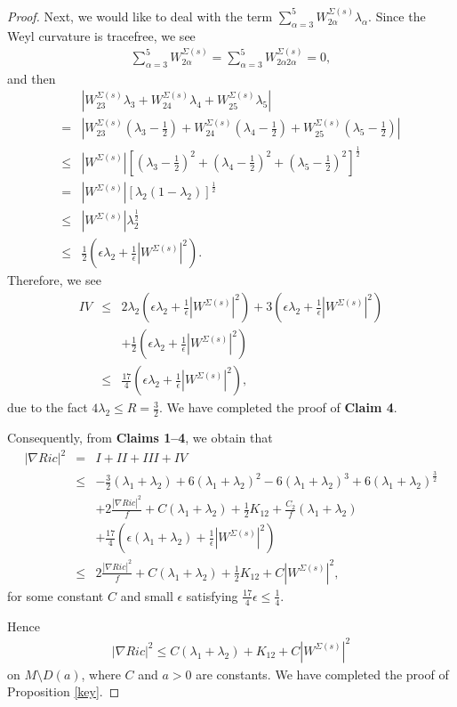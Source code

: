 \documentclass[12pt]{amsart}
\newcommand{\ban}{\begin{eqnarray*}}
\newcommand{\ean}{\end{eqnarray*}}
\begin{document}
\begin{proof}
		
		Next, we would like to deal with the term $\sum_{\alpha=3}^5 W^{\Sigma(s)}_{2\alpha}\lambda_{\alpha}$. Since the Weyl curvature is tracefree,  we see
		\ban
		\sum_{\alpha=3}^5W^{\Sigma(s)}_{2\alpha}=\sum_{\alpha=3}^5W^{\Sigma(s)}_{2\alpha2\alpha}=0,
		\ean
		and then
		\begin{equation}\label{w2a}
		\begin{aligned}
		&|W^{\Sigma(s)}_{23}\lambda_{3}+W^{\Sigma(s)}_{24}\lambda_{4}+W^{\Sigma(s)}_{25}\lambda_{5}|\\
		=&|W^{\Sigma(s)}_{23}(\lambda_{3}-\frac{1}{2})+W^{\Sigma(s)}_{24}(\lambda_{4}-\frac{1}{2})+W^{\Sigma(s)}_{25}(\lambda_{5}-\frac{1}{2})|\\
		\leq&|W^{\Sigma(s)}|[(\lambda_{3}-\frac{1}{2})^2+(\lambda_{4}-\frac{1}{2})^2+(\lambda_{5}-\frac{1}{2})^2]^{\frac{1}{2}}\\
		=&|W^{\Sigma(s)}|[\lambda_{2}(1-\lambda_2)]^{\frac{1}{2}}\\
		\leq&|W^{\Sigma(s)}|\lambda_{2}^{\frac{1}{2}}\\
		\leq&\frac{1}{2}\left( \epsilon\lambda_2+\frac{1}{\epsilon}|W^{\Sigma(s)}|^2\right).
		\end{aligned}
		\end{equation}
		Therefore, we see
		\ban
		IV&\leq&2\lambda_{2}\left( \epsilon\lambda_2+\frac{1}{\epsilon}|W^{\Sigma(s)}|^2\right)+3\left( \epsilon\lambda_2+\frac{1}{\epsilon}|W^{\Sigma(s)}|^2\right)\\
		&&+\frac{1}{2}\left( \epsilon\lambda_2+\frac{1}{\epsilon}|W^{\Sigma(s)}|^2\right)\\
		&\leq&\frac{17}{4}\left( \epsilon\lambda_2+\frac{1}{\epsilon}|W^{\Sigma(s)}|^2\right),
		\ean
		due to the fact $4\lambda_{2}\leq R=\frac{3}{2}$.  We have completed the proof of \textbf{Claim 4}.
		
		\vspace{0.5cm}
		Consequently, from \textbf{Claims 1--4}, we obtain that
		\ban
		|\nabla Ric|^2&=&I+II+III+IV\\
		&\leq&-\frac{3}{2}(\lambda_1+\lambda_2)+6(\lambda_1+\lambda_2)^2-6(\lambda_1+\lambda_2)^3+6(\lambda_1+\lambda_2)^{\frac{3}{2}}\\
		&&+2\frac{|\nabla Ric|^2}{f}+C(\lambda_1+\lambda_2)+\frac{1}{2}K_{12}+\frac{C_2}{f}(\lambda_{1}+\lambda_{2})\\
		&&+\frac{17}{4}\left( \epsilon(\lambda_{1}+\lambda_{2})+\frac{1}{\epsilon}|W^{\Sigma(s)}|^2\right)\\
		&\leq&2\frac{|\nabla Ric|^2}{f}+C(\lambda_1+\lambda_2)+\frac{1}{2}K_{12}+C|W^{\Sigma(s)}|^2,
		\ean
		for some constant $C$ and small $\epsilon$ satisfying $\frac{17}{4}\epsilon\leq\frac{1}{4}$.
		
		\smallskip
		Hence
		\ban
		|\nabla Ric|^2\leq C(\lambda_1+\lambda_2)+K_{12}+C|W^{\Sigma(s)}|^2
		\ean
		on $M\setminus D(a)$, where $C$ and $a>0$ are constants. We have completed the proof of Proposition \ref{key}.
		
	\end{proof}
	
\end{document}
